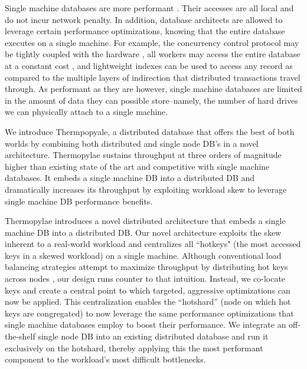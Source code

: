 Single machine databases are more performant \cite{mocc, cicada, ermia}. Their accesses are all local and do not incur network penalty. In addition, database architects are allowed to leverage certain performance optimizations, knowing that the entire database executes on a single machine. For example, the concurrency control protocol may be tightly coupled with the hardware \cite{silo} , all workers may access the entire database at a constant cost , and lightweight indexes can be used to access any record as compared to the multiple layers of indirection  that distributed transactions travel through. As performant as they are however, single machine databases are limited in the amount of data they can possible store--namely, the number of hard drives we can physically attach to a single machine.  

 We introduce Thermpopyale, a distributed database that offers the best of both worlds by combining both distributed and single node DB’s in a novel architecture. Thermopylae sustains throughput at three orders of magnitude higher than existing state of the art and competitive  with single machine databases. It embeds a single machine DB into a distributed DB and dramatically increases its throughput by exploiting workload skew to leverage single machine DB performance benefits.

 Thermopylae introduces a novel distributed architecture that embeds a single machine DB into a distributed DB. Our novel architecture exploits the skew inherent to a real-world workload and centralizes all “hotkeys" (the most accessed keys in a skewed workload) on a single machine. Although conventional load balancing
strategies attempt to maximize throughput by distributing hot keys across nodes \cite{partionskewpavlo, slog, cockroachdb}, our design runs counter to that
intuition. Instead, we co-locate keys and create a central point to which targeted, aggressive optimizations can now be applied. This centralization enables the “hotshard” (node on which hot keys are congregated) to now leverage the same performance optimizations that single machine databases employ to boost their performance. We integrate an off-the-shelf single node DB into an existing distributed database and run it exclusively on the hotshard, thereby applying this the most performant component to the workload’s most difficult bottlenecks. 

